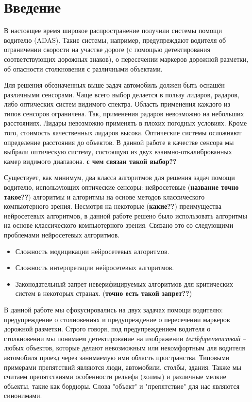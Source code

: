\documentclass[aps,%
14pt,%
final,%
oneside,
onecolumn,%
musixtex, %
superscriptaddress,%
centertags]{extarticle} %
\begin{document}
\tableofcontents

\section*{Введение}




В настоящее время широкое распространение получили системы помощи водителю (ADAS). Такие системы, например, предупреждают водителя об ограничении скорости на участке дороге (с помощью детектирования соответствующих дорожных знаков), о пересечении маркеров дорожной разметки, об опасности столкновения с различными объектами.

Для решения обозначенных выше задач автомобиль должен быть оснашён различными сенсорами. Чаще всего выбор делается в пользу лидаров, радаров, либо оптических систем видимого спектра. Область применения каждого из типов сенсоров ограничена. Так, применения радаров невозможно на небольших расстояниях. Лидары невозможно применять в плохих погодных условиях. Кроме того, стоимость качественных лидаров высока. Оптические системы осложняют определение расстояния до объектов. В данной работе в качестве сенсора мы выбрали оптическую систему, состоящую из двух взаимно-откалиброванных камер видимого диапазона. \textbf{\LARGE с чем связан такой выбор??}

Существует, как минимум, два класса алгоритмов для решения задач помощи водителю, использующих оптические сенсоры: нейросетевые (\textbf{\LARGE название точно такое??}) алгоритмы и алгоритмы на основе методов классического компьютерного зрения. Несмотря на некоторые (\textbf{\LARGE какие??}) преимущества нейросетевых алгоритмов, в данной работе решено было использовать алгоритмы на основе классического компьютерного зрения. Связано это со следующими проблемами нейросетевых алгоритмов.
\begin{itemize}
\item Сложность модицикации нейросетевых алгоритмов.
\item Сложность интерпретации нейросетевых алгоритмов.
\item Законодательный запрет неверифицируемых алгоритмов для критических систем в некоторых странах. (\textbf{\LARGE точно есть такой запрет??})
\end{itemize}

В данной работе мы сфокусировались на двух задачах помощи водителю: предупреждение о столновениях и предупреждение о пересечении маркеров дорожной разметки. Строго говоря, под предупреждением водителя о столкновении мы понимаем детектирование на изображении \textit{textbf{препятствий}} -- любых объектов, которые делают невозможным или некомфортным для водителя автомобиля проезд через занимаемую ими область пространства. Типовыми примерами препятствий являются люди, автомобили, столбы, здания. Также мы считаем препятствиями особенности рельефа (холмы) и различные мелкие объекты, такие как бордюры. Слова "объект" и "препятствие" для нас являются синонимами. 
\end{document}

